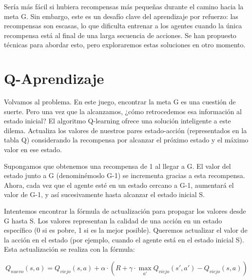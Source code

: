 \documentclass{article}
\begin{document}
\vspace{0.5cm}

Sería más fácil si hubiera recompensas más pequeñas durante el camino hacia la meta G. Sin embargo, este es un desafío clave del aprendizaje por refuerzo: las recompensas son escasas, lo que dificulta entrenar a los agentes cuando la única recompensa está al final de una larga secuencia de acciones. Se han propuesto técnicas para abordar esto, pero exploraremos estas soluciones en otro momento.

\vspace{1cm}

\section{Q-Aprendizaje}

\vspace{1cm}

Volvamos al problema. En este juego, encontrar la meta G es una cuestión de suerte. Pero una vez que la alcanzamos, ¿cómo retrocedemos esa información al estado inicial? El algoritmo Q-learning ofrece una solución inteligente a este dilema. Actualiza los valores de nuestros pares estado-acción (representados en la tabla Q) considerando la recompensa por alcanzar el próximo estado y el máximo valor en ese estado.

\vspace{0.5cm}

Supongamos que obtenemos una recompensa de 1 al llegar a G. El valor del estado junto a G (denominémoslo G-1) se incrementa gracias a esta recompensa. Ahora, cada vez que el agente esté en un estado cercano a G-1, aumentará el valor de G-1, y así sucesivamente hasta alcanzar el estado inicial S.

\vspace{0.5cm}

Intentemos encontrar la fórmula de actualización para propagar los valores desde G hasta S. Los valores representan la calidad de una acción en un estado específico (0 si es pobre, 1 si es la mejor posible). Queremos actualizar el valor de la acción en el estado (por ejemplo, cuando el agente está en el estado inicial S). Esta actualización se realiza con la fórmula:

\vspace{0.5cm}

\[
Q_{nuevo}(s, a) = Q_{viejo}(s, a) + \alpha \cdot \left( R + \gamma \cdot \max_{a'} Q_{viejo}(s', a') - Q_{viejo}(s, a) \right)
\]
\end{document}
